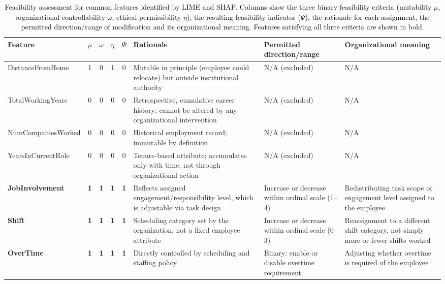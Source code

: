 \documentclass[a4paper,fleqn]{cas-sc}
\begin{document}
\begin{table}[width=1\linewidth, pos=H]
\centering
\caption{\textcolor{black}{Feasibility assessment for common features identified by LIME and SHAP. Columns show the three binary feasibility criteria (mutability $\mu$, organizational controllability $\omega$, ethical permissibility $\eta$), the resulting feasibility indicator ($\Psi$), the rationale for each assignment, the permitted
direction/range of modification and its organizational meaning. Features satisfying all three criteria are shown in bold.}}
\label{tab:feasibility_complete}
\begin{tabular}{p{3cm}ccccp{3.25cm}p{2.7cm}p{3.25cm}}
\toprule
\textbf{Feature} & $\mu$ & $\omega$ & $\eta$ & $\Psi$ & \textbf{Rationale} & \textbf{Permitted direction/range} & \textbf{Organizational meaning} \\
\midrule
DistanceFromHome & 1 & 0 & 1 & 0 &
Mutable in principle (employee could relocate) but outside institutional authority &
N/A (excluded) & N/A \\
\midrule
TotalWorkingYears & 0 & 0 & 0 & 0 &
Retrospective, cumulative career history; cannot be altered by any organizational intervention &
N/A (excluded) & N/A \\
\midrule
NumCompaniesWorked & 0 & 0 & 0 & 0 &
Historical employment record; immutable by definition &
N/A (excluded) & N/A \\
\midrule
YearsInCurrentRole & 0 & 0 & 0 & 0 &
Tenure-based attribute; accumulates only with time, not through organizational action &
N/A (excluded) & N/A \\
\midrule
\textbf{JobInvolvement} & \textbf{1} & \textbf{1} & \textbf{1} & \textbf{1} &
Reflects assigned engagement/responsibility level, which is adjustable via task design &
Increase or decrease within ordinal scale (1--4) &
Redistributing task scope or engagement level assigned to the employee \\
\midrule
\textbf{Shift} & \textbf{1} & \textbf{1} & \textbf{1} & \textbf{1} &
Scheduling category set by the organization, not a fixed employee attribute &
Increase or decrease within ordinal scale (0--3) &
Reassignment to a different shift category, not simply more or fewer shifts worked \\
\midrule
\textbf{OverTime} & \textbf{1} & \textbf{1} & \textbf{1} & \textbf{1} &
Directly controlled by scheduling and staffing policy &
Binary: enable or disable overtime requirement &
Adjusting whether overtime is required of the employee \\
\bottomrule
\end{tabular}
\end{table}
\end{document}
